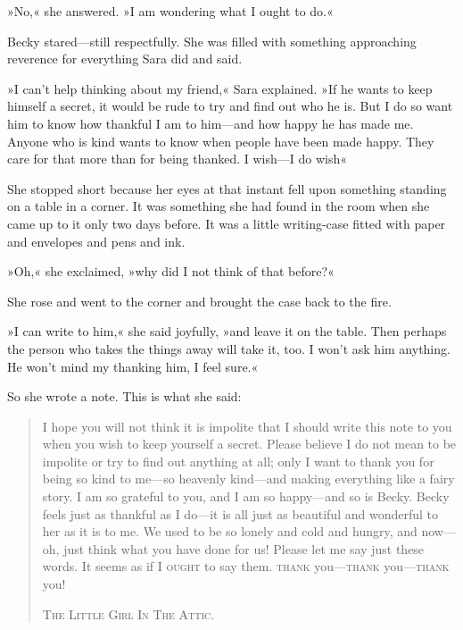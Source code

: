 »No,« she answered. »I am wondering what I ought to do.«

Becky stared—still respectfully. She was filled with something approaching reverence for everything Sara did and said.

»I can't help thinking about my friend,« Sara explained. »If he wants to keep himself a secret, it would be rude to try and find out who he is. But I do so want him to know how thankful I am to him—and how happy he has made me. Anyone who is kind wants to know when people have been made happy. They care for that more than for being thanked. I wish—I do wish\longdash«

She stopped short because her eyes at that instant fell upon something standing on a table in a corner. It was something she had found in the room when she came up to it only two days before. It was a little writing-case fitted with paper and envelopes and pens and ink.

»Oh,« she exclaimed, »why did I not think of that before?«

She rose and went to the corner and brought the case back to the fire.

»I can write to him,« she said joyfully, »and leave it on the table. Then perhaps the person who takes the things away will take it, too. I won't ask him anything. He won't mind my thanking him, I feel sure.«

So she wrote a note. This is what she said:

\begin{quotation}
	
I hope you will not think it is impolite that I should write this note to you when you wish to keep yourself a secret. Please believe I do not mean to be impolite or try to find out anything at all; only I want to thank you for being so kind to me—so heavenly kind—and making everything like a fairy story. I am so grateful to you, and I am so happy—and so is Becky. Becky feels just as thankful as I do—it is all just as beautiful and wonderful to her as it is to me. We used to be so lonely and cold and hungry, and now—oh, just think what you have done for us! Please let me say just these words. It seems as if I \textsc{ought} to say them. \textsc{thank} you—\textsc{thank} you—\textsc{thank} you!

\begin{flushright}\scshape
The Little Girl In The Attic.
\end{flushright}
\end{quotation}


